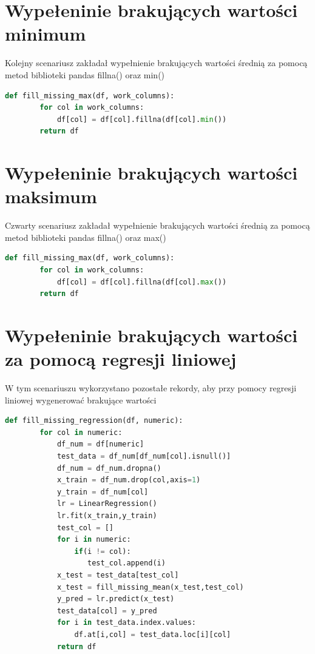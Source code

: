 \documentclass{book}
\begin{document}
\section{Wypełeninie brakujących wartości minimum}
Kolejny scenariusz zakładał wypełnienie brakujących 
wartości średnią za pomocą metod biblioteki pandas fillna() 
oraz min()

\begin{lstlisting}[language=Python, caption={Wypełnienie 
    brakujących wartości minimum}, captionpos=b]
    def fill_missing_max(df, work_columns):
        for col in work_columns:
            df[col] = df[col].fillna(df[col].min())
        return df
\end{lstlisting}

\section{Wypełeninie brakujących wartości maksimum}
Czwarty scenariusz zakładał wypełnienie brakujących 
wartości średnią za pomocą metod biblioteki pandas 
fillna() oraz max()

\begin{lstlisting}[language=Python, caption={Wypełnienie 
    brakujących wartości maksimum}, captionpos=b]
    def fill_missing_max(df, work_columns):
        for col in work_columns:
            df[col] = df[col].fillna(df[col].max())
        return df
\end{lstlisting}

\section{Wypełeninie brakujących wartości za pomocą regresji liniowej}
W tym scenariuszu wykorzystano pozostałe rekordy, 
aby przy pomocy regresji liniowej wygenerować 
brakujące wartości

\begin{lstlisting}[language=Python, caption={Wypełnienie 
    brakujących wartości za pomocą regresji liniowej}, captionpos=b]
    def fill_missing_regression(df, numeric):    
        for col in numeric:
            df_num = df[numeric]
            test_data = df_num[df_num[col].isnull()]
            df_num = df_num.dropna()
            x_train = df_num.drop(col,axis=1)
            y_train = df_num[col]
            lr = LinearRegression()
            lr.fit(x_train,y_train)
            test_col = []
            for i in numeric:
                if(i != col):
                   test_col.append(i)
            x_test = test_data[test_col]
            x_test = fill_missing_mean(x_test,test_col)
            y_pred = lr.predict(x_test)
            test_data[col] = y_pred
            for i in test_data.index.values:
                df.at[i,col] = test_data.loc[i][col]
            return df
\end{lstlisting}
\end{document}
